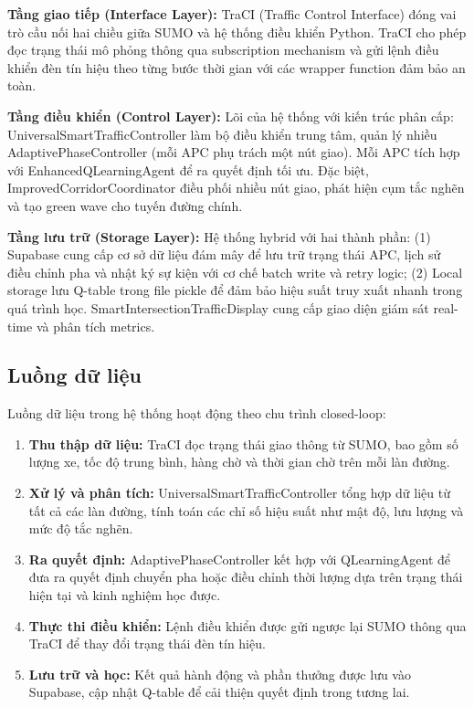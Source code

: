 \textbf{Tầng giao tiếp (Interface Layer):} TraCI (Traffic Control Interface) đóng vai trò cầu nối hai chiều giữa SUMO và hệ thống điều khiển Python. TraCI cho phép đọc trạng thái mô phỏng thông qua subscription mechanism và gửi lệnh điều khiển đèn tín hiệu theo từng bước thời gian với các wrapper function đảm bảo an toàn.

\textbf{Tầng điều khiển (Control Layer):} Lõi của hệ thống với kiến trúc phân cấp: UniversalSmartTrafficController làm bộ điều khiển trung tâm, quản lý nhiều AdaptivePhaseController (mỗi APC phụ trách một nút giao). Mỗi APC tích hợp với EnhancedQLearningAgent để ra quyết định tối ưu. Đặc biệt, ImprovedCorridorCoordinator điều phối nhiều nút giao, phát hiện cụm tắc nghẽn và tạo green wave cho tuyến đường chính.

\textbf{Tầng lưu trữ (Storage Layer):} Hệ thống hybrid với hai thành phần: (1) Supabase cung cấp cơ sở dữ liệu đám mây để lưu trữ trạng thái APC, lịch sử điều chỉnh pha và nhật ký sự kiện với cơ chế batch write và retry logic; (2) Local storage lưu Q-table trong file pickle để đảm bảo hiệu suất truy xuất nhanh trong quá trình học. SmartIntersectionTrafficDisplay cung cấp giao diện giám sát real-time và phân tích metrics.
\subsection{Luồng dữ liệu}

Luồng dữ liệu trong hệ thống hoạt động theo chu trình closed-loop:

\begin{enumerate}
    \item \textbf{Thu thập dữ liệu:} TraCI đọc trạng thái giao thông từ SUMO, bao gồm số lượng xe, tốc độ trung bình, hàng chờ và thời gian chờ trên mỗi làn đường.
    
    \item \textbf{Xử lý và phân tích:} UniversalSmartTrafficController tổng hợp dữ liệu từ tất cả các làn đường, tính toán các chỉ số hiệu suất như mật độ, lưu lượng và mức độ tắc nghẽn.
    
    \item \textbf{Ra quyết định:} AdaptivePhaseController kết hợp với QLearningAgent để đưa ra quyết định chuyển pha hoặc điều chỉnh thời lượng dựa trên trạng thái hiện tại và kinh nghiệm học được.
    
    \item \textbf{Thực thi điều khiển:} Lệnh điều khiển được gửi ngược lại SUMO thông qua TraCI để thay đổi trạng thái đèn tín hiệu.
    
    \item \textbf{Lưu trữ và học:} Kết quả hành động và phần thưởng được lưu vào Supabase, cập nhật Q-table để cải thiện quyết định trong tương lai.
\end{enumerate}

